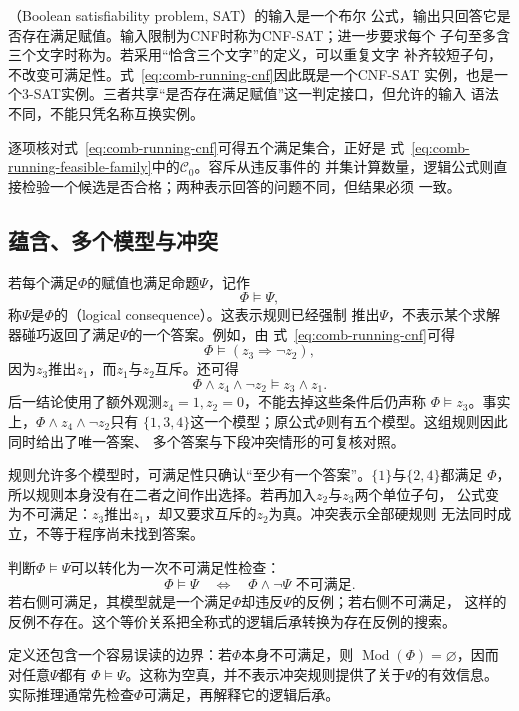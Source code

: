 （Boolean satisfiability problem, SAT）的输入是一个布尔
公式，输出只回答它是否存在满足赋值。输入限制为CNF时称为CNF-SAT；进一步要求每个
子句至多含三个文字时称为。若采用“恰含三个文字”的定义，可以重复文字
补齐较短子句，不改变可满足性。式~\eqref{eq:comb-running-cnf}因此既是一个CNF-SAT
实例，也是一个3-SAT实例。三者共享“是否存在满足赋值”这一判定接口，但允许的输入
语法不同，不能只凭名称互换实例。

逐项核对式~\eqref{eq:comb-running-cnf}可得五个满足集合，正好是
式~\eqref{eq:comb-running-feasible-family}中的$\mathcal{C}_0$。容斥从违反事件的
并集计算数量，逻辑公式则直接检验一个候选是否合格；两种表示回答的问题不同，但结果必须
一致。

\subsection{蕴含、多个模型与冲突}

若每个满足$\Phi$的赋值也满足命题$\Psi$，记作
\[
  \Phi\models\Psi,
\]
称$\Psi$是$\Phi$的（logical consequence）。这表示规则已经强制
推出$\Psi$，不表示某个求解器碰巧返回了满足$\Psi$的一个答案。例如，由
式~\eqref{eq:comb-running-cnf}可得
\[
  \Phi\models(z_3\Rightarrow\neg z_2),
\]
因为$z_3$推出$z_1$，而$z_1$与$z_2$互斥。还可得
\[
  \Phi\land z_4\land\neg z_2
  \models z_3\land z_1.
\]
后一结论使用了额外观测$z_4=1,z_2=0$，不能去掉这些条件后仍声称
$\Phi\models z_3$。事实上，$\Phi\land z_4\land\neg z_2$只有
$\{1,3,4\}$这一个模型；原公式$\Phi$则有五个模型。这组规则因此同时给出了唯一答案、
多个答案与下段冲突情形的可复核对照。

规则允许多个模型时，可满足性只确认“至少有一个答案”。$\{1\}$与$\{2,4\}$都满足
$\Phi$，所以规则本身没有在二者之间作出选择。若再加入$z_2$与$z_3$两个单位子句，
公式变为不可满足：$z_3$推出$z_1$，却又要求互斥的$z_2$为真。冲突表示全部硬规则
无法同时成立，不等于程序尚未找到答案。

判断$\Phi\models\Psi$可以转化为一次不可满足性检查：
\begin{equation}
  \Phi\models\Psi
  \quad\Longleftrightarrow\quad
  \Phi\land\neg\Psi\text{ 不可满足}.
  \label{eq:comb-entailment-unsat}
\end{equation}
若右侧可满足，其模型就是一个满足$\Phi$却违反$\Psi$的反例；若右侧不可满足，
这样的反例不存在。这个等价关系把全称式的逻辑后承转换为存在反例的搜索。

定义还包含一个容易误读的边界：若$\Phi$本身不可满足，则
$\operatorname{Mod}(\Phi)=\varnothing$，因而对任意$\Psi$都有
$\Phi\models\Psi$。这称为空真，并不表示冲突规则提供了关于$\Psi$的有效信息。
实际推理通常先检查$\Phi$可满足，再解释它的逻辑后承。

